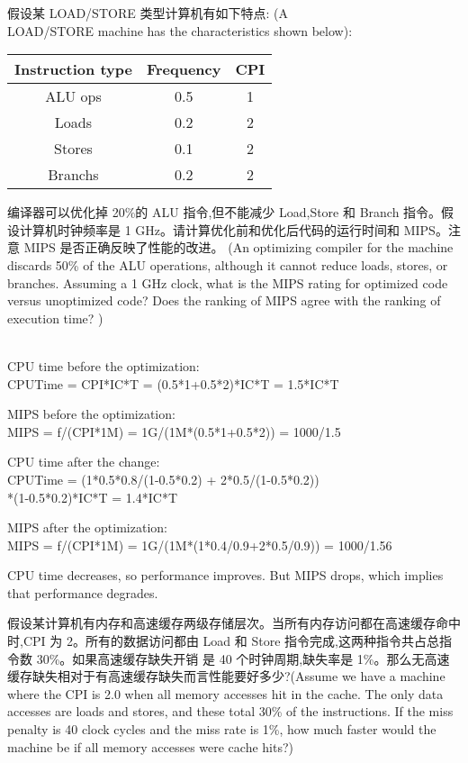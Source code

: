 \documentclass[a4paper, 12pt, addpoints, answers]{exam}
\begin{document}
\begin{questions}
\question[10]
假设某 LOAD/STORE 类型计算机有如下特点: (A \\ LOAD/STORE machine has the characteristics
shown below):

\begin{center}
  \begin{tabular}{ | c | c | c | }
    \hline
    Instruction type & Frequency & CPI \\ \hline
    ALU ops & 0.5 & 1 \\ \hline
    Loads & 0.2 & 2 \\ \hline
    Stores & 0.1 & 2 \\ \hline
    Branchs & 0.2 & 2 \\
    \hline
  \end{tabular}
\end{center}

编译器可以优化掉 20\%的 ALU 指令,但不能减少 Load,Store 和 Branch 指令。假设计算机时钟频率是 1
GHz。请计算优化前和优化后代码的运行时间和 MIPS。注意 MIPS 是否正确反映了性能的改进。 (An optimizing
compiler for the machine discards 50\% of the ALU operations, although it cannot reduce loads, stores, or branches.
Assuming a 1 GHz clock, what is the MIPS rating for optimized code versus unoptimized code? Does the ranking of
MIPS agree with the ranking of execution time? )


\begin{solution}
{ } \\
CPU time before the optimization:  \\
\centering CPUTime = CPI*IC*T = (0.5*1+0.5*2)*IC*T = 1.5*IC*T   \\
\raggedright MIPS before the optimization:  \\
\centering MIPS = f/(CPI*1M) = 1G/(1M*(0.5*1+0.5*2)) = 1000/1.5   \\
\raggedright CPU time after the change: \\
\centering CPUTime = (1*0.5*0.8/(1-0.5*0.2) + 2*0.5/(1-0.5*0.2)) \\
*(1-0.5*0.2)*IC*T = 1.4*IC*T   \\
\raggedright MIPS after the optimization:  \\
\centering MIPS = f/(CPI*1M) = 1G/(1M*(1*0.4/0.9+2*0.5/0.9)) = 1000/1.56   \\
\raggedright CPU time decreases, so performance improves. But MIPS drops, which implies that performance degrades.
\end{solution}

\question[10]
假设某计算机有内存和高速缓存两级存储层次。当所有内存访问都在高速缓存命中时,CPI
为 2。所有的数据访问都由 Load 和 Store 指令完成,这两种指令共占总指令数 30\%。如果高速缓存缺失开销
是 40 个时钟周期,缺失率是 1\%。那么无高速缓存缺失相对于有高速缓存缺失而言性能要好多少?(Assume we
have a machine where the CPI is 2.0 when all memory accesses hit in the cache. The only data accesses are loads and
stores, and these total 30\% of the instructions. If the miss penalty is 40 clock cycles and the miss rate is 1\%, how
much faster would the machine be if all memory accesses were cache hits?)


\end{questions}
\end{document}
